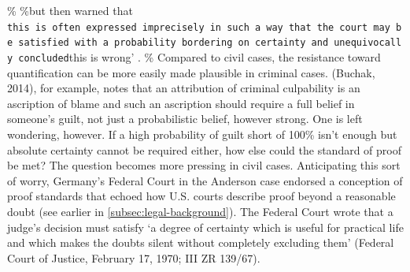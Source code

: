 \documentclass[10pt,dvipsnames]{scrartcl}
\begin{document}
\% \%but then warned that
\texttt{this\ is\ often\ expressed\ imprecisely\ in\ such\ a\ way\ that\ the\ court\ may\ be\ satisfied\ with\ a\ probability\ bordering\ on\ certainty\textquotesingle{}\ and\ unequivocally\ concluded}this
is wrong' . \% Compared to civil cases, the resistance toward
quantification can be more easily made plausible in criminal cases.
(Buchak, 2014), for example, notes that an attribution of criminal
culpability is an ascription of blame and such an ascription should
require a full belief in someone's guilt, not just a probabilistic
belief, however strong. One is left wondering, however. If a high
probability of guilt short of 100\% isn't enough but absolute certainty
cannot be required either, how else could the standard of proof be met?
The question becomes more pressing in civil cases. Anticipating this
sort of worry, Germany's Federal Court in the Anderson case endorsed a
conception of proof standards that echoed how U.S. courts describe proof
beyond a reasonable doubt (see earlier in
\ref{subsec:legal-background}). The Federal Court wrote that a judge's
decision must satisfy `a degree of certainty which is useful for
practical life and which makes the doubts silent without completely
excluding them' (Federal Court of Justice, February 17, 1970; III ZR
139/67).
\end{document}
